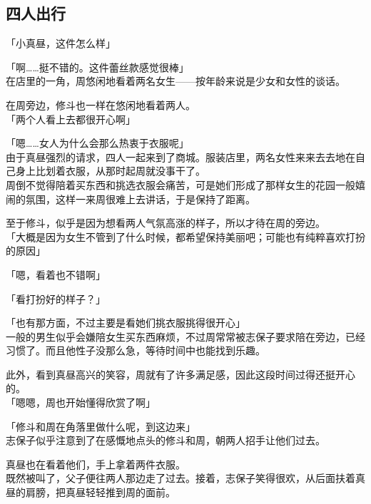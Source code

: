\subsection{四人出行}

「小真昼，这件怎么样」

「啊……挺不错的。这件蕾丝款感觉很棒」\\

在店里的一角，周悠闲地看着两名女生——按年龄来说是少女和女性的谈话。

在周旁边，修斗也一样在悠闲地看着两人。\\

「两个人看上去都很开心啊」

「嗯……女人为什么会那么热衷于衣服呢」\\

由于真昼强烈的请求，四人一起来到了商城。服装店里，两名女性来来去去地在自己身上比划着衣服，从那时起周就没事干了。\\

周倒不觉得陪着买东西和挑选衣服会痛苦，可是她们形成了那样女生的花园一般嬉闹的氛围，这样一来周很难上去讲话，于是保持了距离。

至于修斗，似乎是因为想看两人气氛高涨的样子，所以才待在周的旁边。\\

「大概是因为女生不管到了什么时候，都希望保持美丽吧；可能也有纯粹喜欢打扮的原因」

「嗯，看着也不错啊」

「看打扮好的样子？」

「也有那方面，不过主要是看她们挑衣服挑得很开心」\\

一般的男生似乎会嫌陪女生买东西麻烦，不过周常常被志保子要求陪在旁边，已经习惯了。而且他性子没那么急，等待时间中也能找到乐趣。

此外，看到真昼高兴的笑容，周就有了许多满足感，因此这段时间过得还挺开心的。\\

「嗯嗯，周也开始懂得欣赏了啊」

「修斗和周在角落里做什么呢，到这边来」\\

志保子似乎注意到了在感慨地点头的修斗和周，朝两人招手让他们过去。

真昼也在看着他们，手上拿着两件衣服。\\

既然被叫了，父子便往两人那边走了过去。接着，志保子笑得很欢，从后面扶着真昼的肩膀，把真昼轻轻推到周的面前。\\

